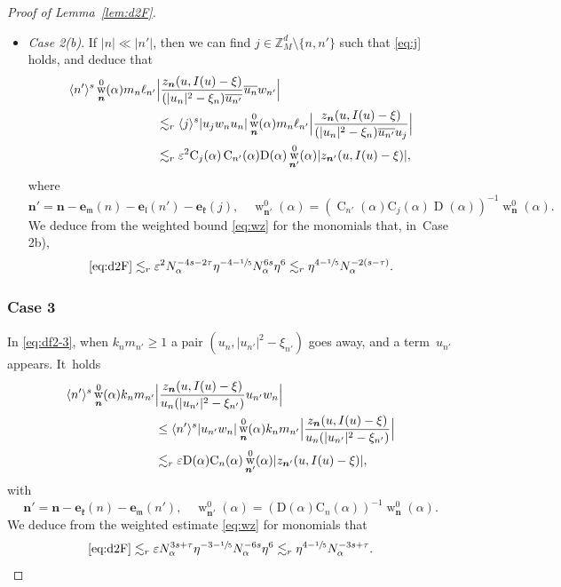 \documentclass[10pt,a4paper]{amsart}
\DeclareMathOperator{\rw}{w}
\theoremstyle{plain}
\theoremstyle{definition}
\newcommand{\nb}{{\boldsymbol n}}
\newcommand{\Z}{\mathbb{Z}}
\newcommand{\1}{\mathbf{1}}
\let\epsilon\varepsilon
\begin{document}
\begin{proof}[Proof of Lemma~\ref{lem:d2F}]
\begin{itemize}
\item
\textit{Case 2(b)}. If
$
|n|\ll |n'|
$,
then we can find $j \in \Z_{M}^{d}\setminus\{n,n'\}$ such that \eqref{eq:j} holds, and deduce that
\begin{align*}
\langle n'\rangle^{s} \rw_{\nb}^{0}(\alpha)m_{n}\ell_{n'}
&\Bigl|
\frac{z_{\nb}(u,I(u)-\xi)}
{(|u_{n}|^{2}-\xi_{n})\overline{u_{n'}}}
\overline{u_{n}}w_{n'}
\Bigr| \\
&
\lesssim_{r}\langle j\rangle^{s}|u_{j}w_{n}u_{n}| \rw_{\nb}^{0}(\alpha)m_{n}\ell_{n'}
\Bigl|
\frac{z_{\nb}(u,I(u)-\xi)}
{(|u_{n}|^{2}-\xi_{n})\overline{u_{n'}}u_{j}}
\Bigr| \\
&\lesssim_{r}
\epsilon^{2}\mathrm{C}_{j}(\alpha)\operatorname{C}_{n'}(\alpha)\mathrm{D}(\alpha)
\rw_{\nb'}^{0}(\alpha)
|z_{\nb'}(u,I(u)-\xi)|,
\end{align*}
where
\[
\nb'=
\nb-\boldsymbol{e}_{\mathfrak{m}}(n)-\boldsymbol{e}_{\mathfrak{l}}(n')-\boldsymbol{e}_{\mathfrak{k}}(j),
\quad
\rw_{\nb'}^{0}(\alpha)=(\operatorname{C}_{n'}(\alpha)\mathrm{C}_{j}(\alpha)\operatorname{D}(\alpha))^{-1}\rw_{\nb}^{0}(\alpha).
\]
We deduce from the weighted bound \eqref{eq:wz} for the monomials that, in~Case 2b),
\[
\eqref{eq:d2F}
\lesssim_{r}\epsilon^{2}
N_{\alpha}^{-4s-2\tau}\eta^{-4-\sfrac{1}{5}}N_{\alpha}^{6s}\eta^{6}
\lesssim_{r}
\eta^{4-\sfrac{1}{5}}N_{\alpha}^{-2(s-\tau)}.
\]
\end{itemize}

\subsubsection*{Case 3} In \eqref{eq:df2-3}, when $k_{n}m_{n'}\geq1$ a pair $(u_{n},|u_{n'}|^{2}-\xi_{n'})$ goes away, and a term~$u_{n'}$ appears. It~holds
\begin{align*}
\langle n'\rangle^{s} \rw_{\nb}^{0}(\alpha)k_{n}m_{n'}
&\Bigl|\frac{z_{\nb}(u,I(u)-\xi)}{u_{n}(|u_{n'}|^{2}-\xi_{n'})}u_{n'}w_{n}\Bigr| \\
&
\leq \langle n'\rangle^{s}
|u_{n'}w_{n}|\rw_{\nb}^{0}(\alpha)k_{n}m_{n'}
\Bigl|
\frac{z_{\nb}(u,I(u)-\xi)}
{u_{n}(|u_{n'}|^{2}-\xi_{n'})}
\Bigr|
\\
&\lesssim_{r}\epsilon\mathrm{D}(\alpha)\mathrm{C}_{n}(\alpha)
\rw^{0}_{\nb'}(\alpha)|z_{\nb'}(u,I(u)-\xi)|,
\end{align*}
with
\[
\nb'
= \nb
-\boldsymbol{e}_{\mathfrak{k}}(n)
-\boldsymbol{e}_{\mathfrak{m}}(n'),\quad
\rw_{\nb'}^{0}(\alpha) = (\mathrm{D}(\alpha)\mathrm{C}_{n}(\alpha))^{-1}\rw_{\nb}^{0}(\alpha).
\]
We deduce from the weighted estimate \eqref{eq:wz} for monomials that
\[
\eqref{eq:d2F}
\lesssim_{r}
\epsilon N_{\alpha}^{3s+\tau}\eta^{-3-\sfrac{1}{5}}N_{\alpha}^{-6s}\eta^{6}
\lesssim_{r} \eta^{4-\sfrac{1}{5}}N_{\alpha}^{-3s+\tau}.
\]


\end{proof}
\end{document}
